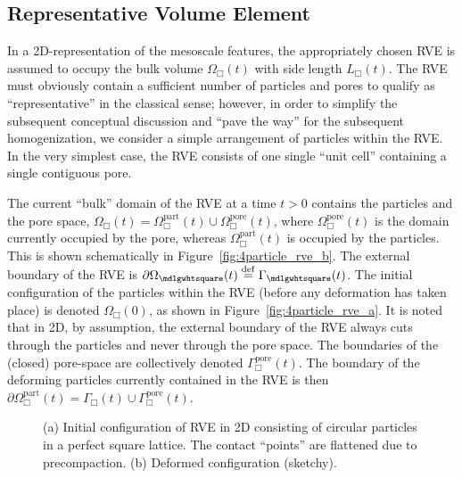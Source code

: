 \documentclass[10pt,a4paper,fleqn]{article}
\renewcommand{\Box}{\mdlgwhtsquare}
\newcommand{\figref}[1]{Figure~\ref{#1}}
\newcommand{\pore}{\mathrm{pore}}
\newcommand{\particle}{\mathrm{part}}
\begin{document}
\subsection{Representative Volume Element}

In a 2D-representation of the mesoscale features, the appropriately chosen RVE is assumed to occupy the bulk volume $\Omega_\Box(t)$ with side length $L_\Box(t)$. The RVE must obviously contain a sufficient number of particles and pores to qualify as ``representative'' in the classical sense; however, in order to simplify the subsequent conceptual discussion and ``pave the way'' for the subsequent homogenization, we consider a simple arrangement of particles within the RVE. In the very simplest case, the RVE consists of one single ``unit cell'' containing a single contiguous pore.

The current ``bulk'' domain of the RVE at a time $t>0$ contains the particles and the pore space, $\Omega_\Box(t)=\Omega^\particle_\Box(t)\cup\Omega_\Box^\pore(t)$, where $\Omega_\Box^\pore(t)$ is the domain currently occupied by the pore, whereas $\Omega_\Box^\particle(t)$ is occupied by the particles. This is shown schematically in \figref{fig:4particle_rve_b}.
The external boundary of the RVE is $\partial\Omega_\Box(t)\defeq\Gamma_\Box(t)$. The initial configuration of the particles within the RVE (before any deformation has taken place) is denoted $\Omega_\Box(0)$, as shown in \figref{fig:4particle_rve_a}. It is noted that in 2D, by assumption, the external boundary of the RVE always cuts through the particles and never through the pore space. The boundaries of the (closed) pore-space are collectively denoted $\Gamma_\Box^\pore(t)$. The boundary of the deforming particles currently contained in the RVE is then $\partial\Omega^\particle_\Box(t)=\Gamma_\Box(t)\cup\Gamma_\Box^\pore(t)$.
\begin{figure}[th!]
    \centering
    \subfloat[$t = 0$]{\label{fig:4particle_rve_a}}
    \subfloat[$t > 0$]{\label{fig:4particle_rve_b}}
    \caption{(a) Initial configuration of RVE in 2D consisting of circular particles in a perfect square lattice. The contact ``points'' are flattened due to precompaction. (b) Deformed configuration (sketchy).}
    \label{fig:4particleRVE}
\end{figure}
\end{document}
